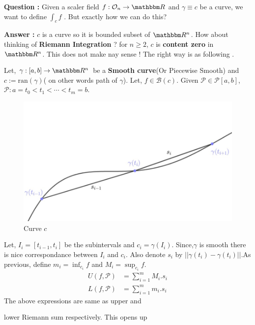 \documentclass[Analysis-3]{subfiles}
\begin{document}
\textbf{Question :} Given a scaler field $f : \mathcal{O}_n \to \R$ and $\gamma \equiv c$ be a curve, we want to define $\int_c f$ . But exactly how we can do this? 

\textbf{Answer :} $c$ is a curve so it is bounded subset of $\R^n$. How about thinking of \textbf{Riemann Integration} ? for $n \ge 2$, $c$ is \textbf{content zero} in $\R^n$. This does not make nay sense ! The right way is as following .

\vspace*{0.5cm}

Let, $\gamma :[a,b]\to \R^n$ be a \textbf{Smooth curve}(Or Piecewise Smooth) and $c:= \text{ran}(\gamma)$( on other words path of $\gamma$). Let, $f \in \mathscr{B}(c)$. Given $\mathcal{P} \in \mathscr{P}[a,b]$, $\mathcal{P} : a = t_0<t_1<\cdots <t_m = b$.
  
\vspace{0.2cm}

\begin{figure}
    \centering
    \includegraphics[width=.98\linewidth]{figures/lec-23.1.png}
    \caption{Curve $c$}
\end{figure}
Let, $I_i = [t_{i-1},t_i]$ be the subintervals and $c_i = \gamma(I_i)$. 
Since,$\gamma$ is smooth there is nice correspondance between $I_i$ and $c_i$. Also denote $s_i$ by $||\gamma(t_i) - \gamma(t_i)||$.As previous, define $m_i = \inf_{c_i}f$ and $M_i = \sup_{c_i}f$.
\begin{align*}
    U(f,\mathcal{P}) &= \sum_{i=1}^{m}M_i.s_i \\
    L(f,\mathcal{P}) &= \sum_{i=1}^{m}m_i.s_i 
\end{align*}
The above expressions are same as upper and \vspace{0.05cm} 

lower Riemann sum respectively. This opens up 
\end{document}
